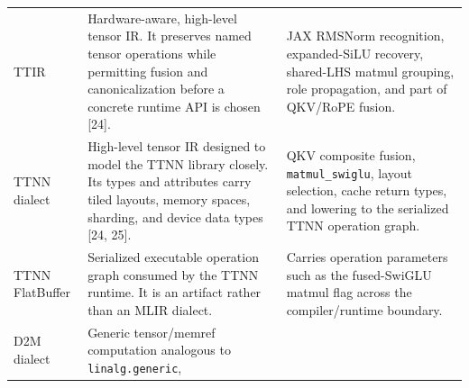 \documentclass[
  10pt,
  american,
  10pt,
  letterpaper]{article}
\begin{document}
\begin{longtable}[]{@{}lll@{}}
\begin{minipage}[t]{0.30\columnwidth}\raggedright
TTIR\strut
\end{minipage} & \begin{minipage}[t]{0.30\columnwidth}\raggedright
Hardware-aware, high-level tensor IR. It preserves named tensor
operations while permitting fusion and canonicalization before a
concrete runtime API is chosen {[}24{]}.\strut
\end{minipage} & \begin{minipage}[t]{0.30\columnwidth}\raggedright
JAX RMSNorm recognition, expanded-SiLU recovery, shared-LHS matmul
grouping, role propagation, and part of QKV/RoPE fusion.\strut
\end{minipage}\tabularnewline
\begin{minipage}[t]{0.30\columnwidth}\raggedright
TTNN dialect\strut
\end{minipage} & \begin{minipage}[t]{0.30\columnwidth}\raggedright
High-level tensor IR designed to model the TTNN library closely. Its
types and attributes carry tiled layouts, memory spaces, sharding, and
device data types {[}24, 25{]}.\strut
\end{minipage} & \begin{minipage}[t]{0.30\columnwidth}\raggedright
QKV composite fusion, \texttt{matmul\_swiglu}, layout selection, cache
return types, and lowering to the serialized TTNN operation graph.\strut
\end{minipage}\tabularnewline
\begin{minipage}[t]{0.30\columnwidth}\raggedright
TTNN FlatBuffer\strut
\end{minipage} & \begin{minipage}[t]{0.30\columnwidth}\raggedright
Serialized executable operation graph consumed by the TTNN runtime. It
is an artifact rather than an MLIR dialect.\strut
\end{minipage} & \begin{minipage}[t]{0.30\columnwidth}\raggedright
Carries operation parameters such as the fused-SwiGLU matmul flag across
the compiler/runtime boundary.\strut
\end{minipage}\tabularnewline
\begin{minipage}[t]{0.30\columnwidth}\raggedright
D2M dialect\strut
\end{minipage} & \begin{minipage}[t]{0.30\columnwidth}\raggedright
Generic tensor/memref computation analogous to \texttt{linalg.generic},

\end{minipage}
\end{longtable}
\end{document}

